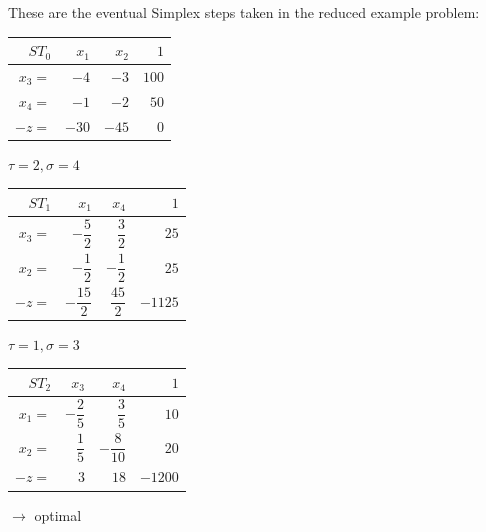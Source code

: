 \documentclass[a4paper, 11pt]{article}
\makeatletter
\renewenvironment{quotation}
{\list{}{\listparindent=1.5em
		\itemindent=0pt
		\parsep\z@ \@plus\p@}%
	\item\relax}
{\endlist}
\makeatother
\begin{document}
\endgroup
\medskip
These are the eventual Simplex steps taken in the reduced example problem:
\begin{quotation}
	
	\begingroup
	\def\arraystretch{2}
	\begin{tabular}{r|rr|r}
		$ST_0$&$x_1$&$x_2$&$1$\\
		\hline
		$x_3=$&$-4$&$-3$&$100$\\
		$x_4=$&$-1$&$-2$&$50$\\
		\hline
		$-z=$&$-30$&$-45$&$0$
	\end{tabular}\hspace{1cm} $\tau = 2, \sigma=4$\\
	\begin{tabular}{r|rr|r}
		$ST_1$&$x_1$&$x_4$&$1$\\
		\hline
		$x_3=$&$-\dfrac{5}{2}$&$\dfrac{3}{2}$&$25$\\
		$x_2=$&$-\dfrac{1}{2}$&$-\dfrac{1}{2}$&$25$\\
		\hline
		$-z=$&$-\dfrac{15}{2}$&$\dfrac{45}{2}$&$-1125$
	\end{tabular}\hspace{1cm} $\tau = 1, \sigma=3$
	\\
	\begin{tabular}{r|rr|r}
		$ST_2$&$x_3$&$x_4$&$1$\\
		\hline
		$x_1=$&$-\dfrac{2}{5}$&$\dfrac{3}{5}$&$10$\\
		$x_2=$&$\dfrac{1}{5}$&$-\dfrac{8}{10}$&$20$\\
		\hline
		$-z=$&$3$&$18$&$-1200$
	\end{tabular}\hspace{1cm} $\longrightarrow$ optimal
	\endgroup
\end{quotation}
\end{document}
